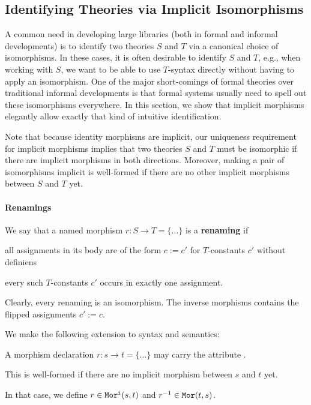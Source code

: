 \subsection{Identifying Theories via Implicit Isomorphisms}\label{sec:inverse}

A common need in developing large libraries (both in formal and informal developments) is to identify two theories $S$ and $T$ via a canonical choice of isomorphisms.
In these cases, it is often desirable to identify $S$ and $T$, e.g., when working with $S$, we want to be able to use $T$-syntax directly without having to apply an isomorphism.
One of the major short-comings of formal theories over traditional informal developments is that formal systems usually need to spell out these isomorphisms everywhere.
In this section, we show that implicit morphisms elegantly allow exactly that kind of intuitive identification.

Note that because identity morphisms are implicit, our uniqueness requirement for implicit morphisms implies that two theories $S$ and $T$ must be isomorphic if there are implicit morphisms in both directions.
Moreover, making a pair of isomorphisms implicit is well-formed if there are no other implicit morphisms between $S$ and $T$ yet.

\paragraph{Renamings}
We say that a named morphism $r:S\to T=\{\ldots\}$ is a \textbf{renaming} if
\begin{compactitem}
 \item all assignments in its body are of the form $c:=c'$ for $T$-constants $c'$ without definiens
 \item every such $T$-constants $c'$ occurs in exactly one assignment.
\end{compactitem}
Clearly, every renaming is an isomorphism.
The inverse morphisms contains the flipped assignments $c':=c$.

We make the following extension to syntax and semantics:
\begin{compactitem}
  \item A morphism declaration $r:s\to t=\{\ldots\}$ may carry the attribute .
  \item This is well-formed if there are no implicit morphism between $s$ and $t$ yet.
  \item In that case, we define $r\in\mathtt{Mor^i}(s,t)$ and $r^{-1}\in\mathtt{Mor}(t,s)$.
\end{compactitem}

